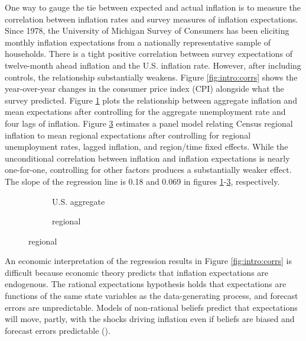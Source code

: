 \documentclass[12pt]{article}
\begin{document}
One way to gauge the tie between expected and actual inflation is to measure the correlation between inflation rates and survey measures of inflation expectations. Since 1978, the University of Michigan Survey of Consumers has been eliciting monthly inflation expectations from a nationally representative sample of households. There is a tight positive correlation between survey expectations of twelve-month ahead inflation and the U.S. inflation rate. However, after including controls, the relationship substantially weakens. Figure \ref{fig:intro:corrs} shows the year-over-year changes in the consumer price index (CPI) alongside what the survey predicted. Figure \ref{subfig:intro:us} plots the relationship between aggregate inflation and mean expectations after controlling for the aggregate unemployment rate and four lags of inflation. Figure \ref{subfig:intro:reg} estimates a panel model relating Census regional inflation to mean regional expectations after controlling for regional unemployment rates, lagged inflation, and region/time fixed effects. While the unconditional correlation between inflation and inflation expectations is nearly one-for-one, controlling for other factors produces a substantially weaker effect. The slope of the regression line is 0.18 and 0.069 in figures \ref{subfig:intro:us}-\ref{subfig:intro:reg}, respectively.\begin{figure}
\centering
\caption{Inflation and inflation expectations}\label{fig:intro:corrs}
\begin{subfigure}[t]{0.45\textwidth}
\centering

\caption{U.S. aggregate}\label{subfig:intro:us}
\end{subfigure}
\hfill
\begin{subfigure}[t]{0.45\textwidth}
\centering

\caption{regional}\label{subfig:intro:reg}
\end{subfigure}
\end{figure}

An economic interpretation of the regression results in Figure \ref{fig:intro:corrs} is difficult because economic theory predicts that inflation expectations are endogenous. The rational expectations hypothesis holds that expectations are functions of the same state variables as the data-generating process, and forecast errors are unpredictable. Models of non-rational beliefs predict that expectations will move, partly, with the shocks driving inflation even if beliefs are biased and forecast errors predictable (\cite{SophoclesJME}). 
\end{document}
